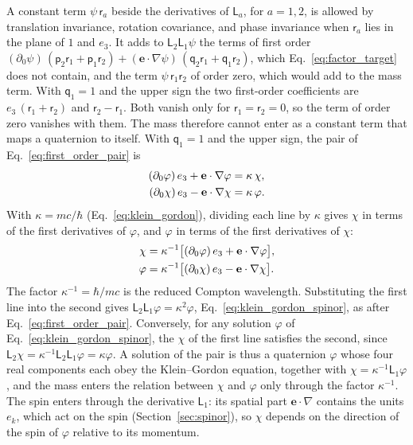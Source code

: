 \documentclass[aps,prd,onecolumn,tightenlines,nofootinbib,notitlepage,11pt,floatfix]{revtex4-2}
\theoremstyle{indentedtheorem}
\begin{document}
A constant term $\psi\,\mathsf{r}_a$ beside the derivatives of $\mathsf{L}_a$, for $a=1,2$, is allowed by translation invariance, rotation covariance, and phase invariance when $\mathsf{r}_a$ lies in the plane of $1$ and $e_3$. It adds to $\mathsf{L}_2\mathsf{L}_1\psi$ the terms of first order $(\partial_0\psi)\,(\mathsf{p}_2\mathsf{r}_1+\mathsf{p}_1\mathsf{r}_2)+(\mathbf{e}\cdot\nabla\psi)\,(\mathsf{q}_2\mathsf{r}_1+\mathsf{q}_1\mathsf{r}_2)$, which Eq.~\eqref{eq:factor_target} does not contain, and the term $\psi\,\mathsf{r}_1\mathsf{r}_2$ of order zero, which would add to the mass term. With $\mathsf{q}_1=1$ and the upper sign the two first-order coefficients are $e_3\,(\mathsf{r}_1+\mathsf{r}_2)$ and $\mathsf{r}_2-\mathsf{r}_1$. Both vanish only for $\mathsf{r}_1=\mathsf{r}_2=0$, so the term of order zero vanishes with them. The mass therefore cannot enter as a constant term that maps a quaternion to itself. With $\mathsf{q}_1=1$ and the upper sign, the pair of Eq.~\eqref{eq:first_order_pair} is
\begin{align}
    (\partial_0\varphi) \, e_3 + \mathbf{e}\cdot\nabla\varphi &= \kappa \, \chi , \notag\\
    (\partial_0\chi) \, e_3 - \mathbf{e}\cdot\nabla\chi &= \kappa \, \varphi .
    \label{eq:pair_explicit}
\end{align}
With $\kappa=mc/\hbar$ (Eq.~\eqref{eq:klein_gordon}), dividing each line by $\kappa$ gives $\chi$ in terms of the first derivatives of $\varphi$, and $\varphi$ in terms of the first derivatives of $\chi$:
\begin{align}
    \chi &= \kappa^{-1}\big[(\partial_0\varphi) \, e_3 + \mathbf{e}\cdot\nabla\varphi\big] , \notag\\
    \varphi &= \kappa^{-1}\big[(\partial_0\chi) \, e_3 - \mathbf{e}\cdot\nabla\chi\big] .
    \label{eq:pair_link}
\end{align}
The factor $\kappa^{-1}=\hbar/mc$ is the reduced Compton wavelength. Substituting the first line into the second gives $\mathsf{L}_2\mathsf{L}_1\varphi=\kappa^2\varphi$, Eq.~\eqref{eq:klein_gordon_spinor}, as after Eq.~\eqref{eq:first_order_pair}. Conversely, for any solution $\varphi$ of Eq.~\eqref{eq:klein_gordon_spinor}, the $\chi$ of the first line satisfies the second, since $\mathsf{L}_2\chi=\kappa^{-1}\mathsf{L}_2\mathsf{L}_1\varphi=\kappa\varphi$. A solution of the pair is thus a quaternion $\varphi$ whose four real components each obey the Klein--Gordon equation, together with $\chi=\kappa^{-1}\mathsf{L}_1\varphi$, and the mass enters the relation between $\chi$ and $\varphi$ only through the factor $\kappa^{-1}$. The spin enters through the derivative $\mathsf{L}_1$: its spatial part $\mathbf{e}\cdot\nabla$ contains the units $e_k$, which act on the spin (Section~\ref{sec:spinor}), so $\chi$ depends on the direction of the spin of $\varphi$ relative to its momentum.
\end{document}
